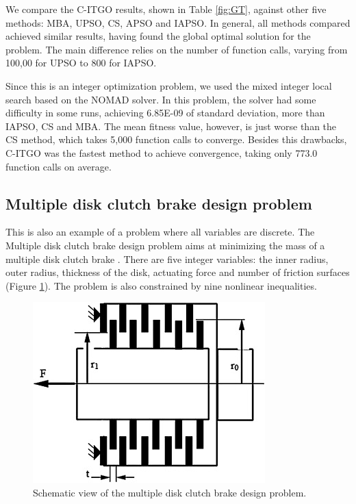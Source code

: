 We compare the C-ITGO results, shown in Table \ref{fig:GT}, against other five methods: MBA, UPSO, CS, APSO and IAPSO. In general, all methods compared achieved similar results, having found the global optimal solution for the problem. The main difference relies on the number of function calls, varying from 100,00 for UPSO to 800 for IAPSO.




Since this is an integer optimization problem, we used the mixed integer local search based on the NOMAD solver. In this problem, the solver had some difficulty in some runs, achieving 6.85E-09 of standard deviation, more than IAPSO, CS and MBA. The mean fitness value, however, is just worse than the CS method, which takes 5,000 function calls to converge. Besides this drawbacks, C-ITGO was the fastest method to achieve convergence, taking only 773.0 function calls on average.



\subsection{Multiple disk clutch brake design problem}

This is also an example of a problem where all variables are discrete. The Multiple disk clutch brake design problem aims at minimizing the mass of a multiple disk clutch brake \cite{MD}. There are five integer variables: the inner radius, outer radius, thickness of the disk, actuating force and number of friction surfaces (Figure \ref{fig:MD}). The problem is also constrained by nine nonlinear inequalities.

\begin{figure}[h]
\begin{center}
\includegraphics[scale=0.6]{Imgs/MD.jpg}
\end{center}
\captionsetup{justification=centering}
\caption{Schematic view of the multiple disk clutch brake design problem.}\label{fig:MD}
\end{figure}

